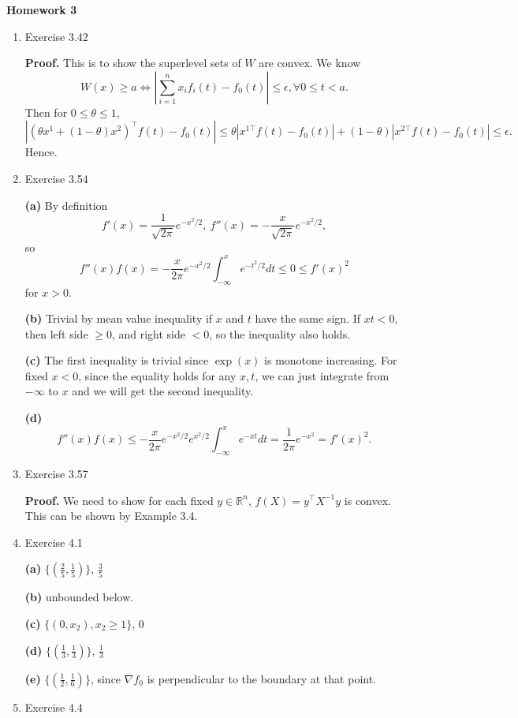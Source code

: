 \documentclass{article}%
\begin{document}
\begin{center}
\textbf{Homework 3}\bigskip
\end{center}
\begin{enumerate}
\item Exercise 3.42

\textbf{Proof.} This is to show the superlevel sets of $W$ are convex. We know
$$
W(x)\ge a\iff |\sum_{i=1}^{n}x_if_i(t) - f_0(t)| \le \epsilon,  \forall 0 \le t < a.
$$
Then for $0\le \theta \le 1$, 
$$
|(\theta x^1+(1-\theta) x^2)^\top f(t) - f_0(t)| \le \theta|x^{1\top} f(t)-f_0(t)|+(1-\theta)|x^{2\top} f(t)-f_0(t)|\le \epsilon.
$$
Hence.

\item Exercise 3.54

\textbf{(a)} By definition
$$
f'(x) = \frac{1}{\sqrt{2\pi}}e^{-x^2/2}, ~f''(x) = -\frac{x}{\sqrt{2\pi}}e^{-x^2/2},
$$
so
$$
f''(x)f(x) = -\frac{x}{2\pi}e^{-x^2/2}\int_{-\infty}^x e^{-t^2/2}dt \le 0 \le f'(x)^2
$$
for $x > 0$.

\textbf{(b)} Trivial by mean value inequality if $x$ and $t$ have the same sign. If $xt < 0$, then left side $\ge 0$, and right side $< 0$, so the inequality also holds.

\textbf{(c)} The first inequality is trivial since $\exp(x)$ is monotone increasing. For fixed $x < 0$, since the equality holds for any $x, t$, we can just integrate from $-\infty$ to $x$ and we will get the second inequality.

\textbf{(d)} 
$$
f''(x)f(x) \le -\frac{x}{2\pi}e^{-x^2/2}e^{x^2/2}\int_{-\infty}^x e^{-xt}dt = \frac{1}{2\pi}e^{-x^2} = f'(x)^2.
$$

\item Exercise 3.57

\textbf{Proof.} We need to show for each fixed $y\in\mathbb{R}^n $, $f(X) = y^\top X^{-1}y $ is convex. This can be shown by Example 3.4.

\item Exercise 4.1

\textbf{(a)} $\{(\frac{2}{5}, \frac{1}{5})\}$, $\frac{3}{5}$

\textbf{(b)} unbounded below.

\textbf{(c)} $\{(0, x_2), x_2\ge 1\}$, 0

\textbf{(d)} $\{(\frac{1}{3}, \frac{1}{3})\}$, $\frac{1}{3}$

\textbf{(e)} $\{(\frac{1}{2}, \frac{1}{6})\}$, since $\nabla f_0 $ is perpendicular to the boundary at that point.

\item Exercise 4.4


\end{enumerate}
\end{document}
